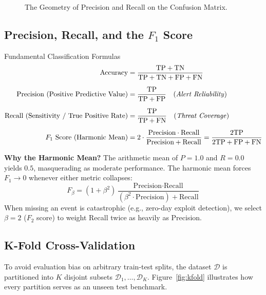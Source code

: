 \documentclass[11pt,a4paper]{article}
\begin{document}
\begin{figure}[htbp]
\caption{The Geometry of Precision and Recall on the Confusion Matrix.}
\label{fig:confusion_matrix}
\end{figure}

\subsection{Precision, Recall, and the $F_1$ Score}

\begin{mathbox}{Fundamental Classification Formulas}
\begin{align}
    \text{Accuracy} &= \frac{\text{TP} + \text{TN}}{\text{TP} + \text{TN} + \text{FP} + \text{FN}} \\[0.2cm]
    \text{Precision (Positive Predictive Value)} &= \frac{\text{TP}}{\text{TP} + \text{FP}} \quad \text{(\textit{Alert Reliability})} \\[0.2cm]
    \text{Recall (Sensitivity / True Positive Rate)} &= \frac{\text{TP}}{\text{TP} + \text{FN}} \quad \text{(\textit{Threat Coverage})} \\[0.2cm]
    F_1 \text{ Score (Harmonic Mean)} &= 2 \cdot \frac{\text{Precision} \cdot \text{Recall}}{\text{Precision} + \text{Recall}} = \frac{2\text{TP}}{2\text{TP} + \text{FP} + \text{FN}}
\end{align}
\end{mathbox}

\noindent \textbf{Why the Harmonic Mean?} The arithmetic mean of $P=1.0$ and $R=0.0$ yields $0.5$, masquerading as moderate performance. The harmonic mean forces $F_1 \to 0$ whenever either metric collapses:
\begin{equation}
    F_\beta = (1 + \beta^2) \frac{\text{Precision} \cdot \text{Recall}}{(\beta^2 \cdot \text{Precision}) + \text{Recall}}
\end{equation}
When missing an event is catastrophic (e.g., zero-day exploit detection), we select $\beta = 2$ ($F_2$ score) to weight Recall twice as heavily as Precision.

\subsection{K-Fold Cross-Validation}
To avoid evaluation bias on arbitrary train-test splits, the dataset $\mathcal{D}$ is partitioned into $K$ disjoint subsets $\mathcal{D}_1, \dots, \mathcal{D}_K$. Figure~\ref{fig:kfold} illustrates how every partition serves as an unseen test benchmark.
\end{document}
